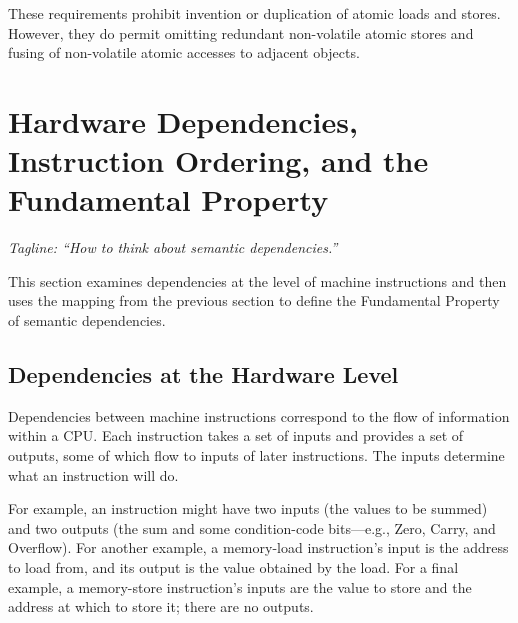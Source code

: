 These requirements prohibit
invention or duplication of atomic loads and stores.
However, they do permit omitting
redundant non-volatile atomic stores and fusing of non-volatile atomic
accesses to adjacent objects.

\section{Hardware Dependencies, Instruction Ordering, and the
Fundamental Property}
\label{sec:Hardware Dependencies, Instruction Ordering, and the
Fundamental Property}

\emph{Tagline: ``How to think about semantic dependencies.'' }

This section examines dependencies at the level of machine instructions
and then uses the mapping from the previous section to define the
Fundamental Property of semantic dependencies.

\subsection{Dependencies at the Hardware Level}
\label{sec:Dependencies at the Hardware Level}

Dependencies between machine instructions correspond to the flow of
information within a CPU.
Each instruction takes a set of inputs and provides a set of outputs,
some of which flow to inputs of later instructions.
The inputs determine what an instruction will do.

For example, an  instruction might have two inputs (the values to
be summed) and two outputs (the sum and some condition-code bits---e.g.,
Zero, Carry, and Overflow).
For another example, a memory-load instruction's input is the address
to load from, and its output is the value obtained by the load.
For a final example, a memory-store instruction's inputs are the value
to store and the address at which to store it; there are no outputs.

